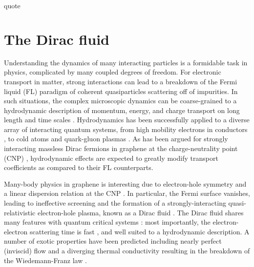 \begin{savequote}[75mm]
quote
\end{savequote}

\chapter{The Dirac fluid}
\label{ch:the_Dirac_fluid}
Understanding the dynamics of many interacting particles is a formidable task in physics, complicated by many coupled degrees of freedom.   For electronic transport in matter, strong interactions can lead to a breakdown of the Fermi liquid (FL) paradigm of coherent quasiparticles scattering off of impurities.  In such situations, the complex microscopic dynamics can be coarse-grained to a hydrodynamic description of momentum, energy, and charge transport on long length and time scales \cite{kadanoff_hydrodynamic_1963}. Hydrodynamics has been successfully applied to a diverse array of interacting quantum systems, from high mobility electrons in conductors \cite{jong_hydrodynamic_1995}, to cold atoms \cite{cao_universal_2011} and quark-gluon plasmas \cite{shuryak_why_2004}.   As has been argued for strongly interacting massless Dirac fermions in graphene at the charge-neutrality point (CNP) \cite{muller_collective_2008, foster_slow_2009, apostolov_hydrodynamic_2014, narozhny_hydrodynamics_2015}, hydrodynamic effects are expected to greatly modify transport coefficients as compared to their FL counterparts.

Many-body physics in graphene is interesting due to electron-hole symmetry and a linear dispersion relation at the CNP \cite{novoselov_two-dimensional_2005, zhang_experimental_2005}. In particular, the Fermi surface vanishes, leading to ineffective screening \cite{siegel_charge-carrier_2013} and the formation of a strongly-interacting quasi-relativistic electron-hole plasma, known as a Dirac fluid \cite{sheehy_quantum_2007}.  The Dirac fluid shares many features with quantum critical systems \cite{keimer_quantum_2011}: most importantly, the electron-electron scattering time is fast \cite{lui_ultrafast_2010, breusing_ultrafast_2009, tielrooij_photoexcitation_2013, johannsen_direct_2013}, and well suited to a hydrodynamic description.   A number of exotic properties have been predicted including nearly perfect (inviscid) flow \cite{muller_graphene:_2009} and a diverging thermal conductivity resulting in the breakdown of the Wiedemann-Franz law \cite{muller_quantum-critical_2008,foster_slow_2009}.


